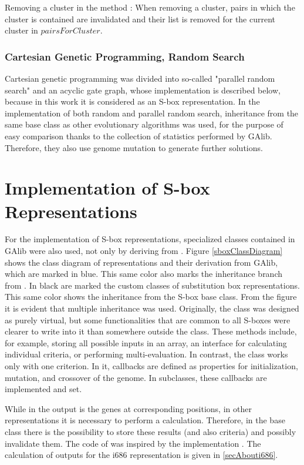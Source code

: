 Removing a cluster in the method :
When removing a cluster, pairs in which the cluster
is contained are invalidated and their list is removed for the current cluster in
$pairsForCluster$.

\subsubsection{Cartesian Genetic Programming, Random Search}
Cartesian genetic programming was divided into so-called "parallel random search"
and an acyclic gate graph, whose implementation is described below, because in this work it is
considered as an S-box representation. In the implementation of both random and parallel random search,
inheritance from the same base class as other evolutionary algorithms was used, for the purpose of easy comparison
thanks to the collection of statistics performed by GAlib. Therefore, they also use genome mutation
to generate further solutions.

\section{Implementation of S-box Representations}
For the implementation of S-box representations, specialized classes contained in GAlib were also used,
not only by deriving from .
Figure \ref{sboxClassDiagram} shows the class diagram of representations and their derivation
from GAlib, which are marked in blue. This same color also marks the inheritance branch from
.
In black are marked the custom classes of substitution box representations. This same color shows
the inheritance from the S-box base class. From the figure it is evident that multiple
inheritance was used. Originally, the class  was designed as purely virtual,
but some functionalities that are common to all S-boxes were clearer to write into it than
somewhere outside the class. These methods include, for example, storing all possible inputs in an array,
an interface for calculating individual criteria, or performing multi-evaluation.
In contrast, the class  works only with one criterion.
In it, callbacks are defined as properties
for initialization, mutation, and crossover of the genome. In subclasses, these callbacks
are implemented and set.


While in  the output is the genes at corresponding positions, in
other representations it is necessary to perform a calculation. Therefore, in the base class there is the possibility to store these results
(and also criteria) and possibly invalidate them.
The code of  was inspired by the implementation \cite{vasicek}.
The calculation of outputs for the i686 representation is given in \ref{secAbouti686}.

